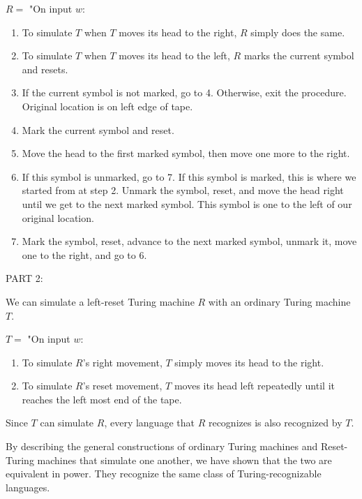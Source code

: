 \documentclass{article}
\begin{document}
\noindent $R = $ "On input $w$:
\begin{enumerate} [\indent 1.]

	\item To simulate $T$ when $T$ moves its head to the right, $R$ simply does the same.
	\item To simulate $T$ when $T$ moves its head to the left, $R$ marks the current symbol and resets.
	\item If the current symbol is not marked, go to 4. Otherwise, exit the procedure. Original location is on left edge of tape.
	\item Mark the current symbol and reset.
	\item Move the head to the first marked symbol, then move one more to the right.
	\item If this symbol is unmarked, go to 7. If this symbol is marked, this is where we started from at step 2.
Unmark the symbol, reset, and move the head right until we get to the next marked symbol. This symbol is one to the left of our original location.
	\item Mark the symbol, reset, advance to the next marked symbol, unmark it, move one to the right, and go to 6.
\newline	
\end{enumerate}



\noindent PART 2:

\noindent We can simulate a left-reset Turing machine $R$ with an ordinary Turing machine $T$.\newline
  
  \noindent $T =$ "On input $w$:
  \begin{enumerate} [\indent 1.]
  
  	\item To simulate $R$'s right movement, $T$ simply moves its head to the right.
  	\item To simulate $R$'s reset movement, $T$ moves its head left repeatedly until it reaches the left most end of the tape. 
  	    \end{enumerate}
    
    \noindent Since $T$ can simulate $R$, every language that $R$ recognizes is also recognized by $T$.\newline
    
    \noindent By describing the general constructions of ordinary Turing machines and Reset-Turing machines that simulate one another, we have shown that the two are equivalent in power. They recognize the same class of Turing-recognizable languages.
\end{document}
